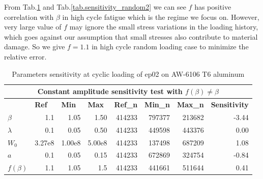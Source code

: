 From Tab.\ref{tab.sensitivity_const2} and Tab.\ref{tab.sensitivity_random2} we can see $f$ has positive correlation with $\beta$ in high cycle fatigue which is the regime we focus on.  However, very large value of $f$ may ignore the small stress variations in the loading history, which goes against our assumption that small stresses also contribute to material damage. So we give $f=1.1$ in high cycle random loading case to minimize the relative error.
\begin{table}[!h]
\centering
\begin{tabular}{lrrrrrrr}
\hline
\multicolumn{8}{c}{\textbf{Constant amplitude sensitivity test with $f(\beta)\neq\beta$}}                                                                                                                                                                                                 \\ \hline
& \multicolumn{1}{l}{\textbf{Ref}} & \multicolumn{1}{l}{\textbf{Min}} & \multicolumn{1}{l}{\textbf{Max}} & \multicolumn{1}{l}{\textbf{Ref\_n}} & \multicolumn{1}{l}{\textbf{Min\_n}} & \multicolumn{1}{l}{\textbf{Max\_n}} & \multicolumn{1}{l}{\textbf{Sensitivity}} \\ \hline
\textbf{$\beta$}    & 1.1                              & 1.05                             & 1.50                             & 414233                              & 797377                              & 213682                              & -3.44                                    \\
\textbf{$\lambda$}  & 0.1                              & 0.05                             & 0.50                             & 414233                              & 449598                              & 443376                              & 0.00                                     \\
\textbf{$W_0$}      & 3.27e8                         & 1.00e8                         & 5.00e8                         & 414233                              & 137498                              & 687209                              & 1.08                                     \\
\textbf{$a$}        & 0.1                              & 0.05                             & 0.15                             & 414233                              & 672869                              & 324754                              & -0.84                                    \\
\textbf{$f(\beta)$} & 1.1                              & 1.05                             & 1.5                              & 414233                              & 441661          &511644          & 0.41                                     \\ \hline
\end{tabular}
\caption{Parameters sensitivity at cyclic loading of ep02 on AW-6106 T6 aluminum}
\label{tab.sensitivity_const2}
\end{table}
